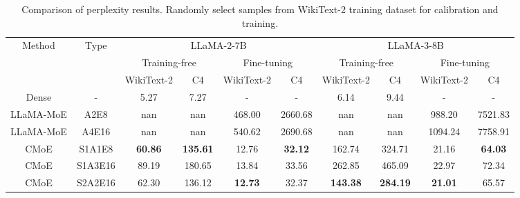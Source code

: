 \begin{table*}[t!]
    \centering
    \vspace{-2mm}
    \caption{Comparison of perplexity results. Randomly select samples from WikiText-2 training dataset for calibration and training.}
    \label{tab:1}
    \begin{adjustbox}{max width=0.85\textwidth}
    \begin{tabular}{cc|cc|cc|cc|cc}
        \toprule
        \multirow{3}{*}{Method} & \multirow{3}{*}{Type}   &\multicolumn{4}{c|}{LLaMA-2-7B} & \multicolumn{4}{c}{LLaMA-3-8B} \\

        ~ & ~  &\multicolumn{2}{c|}{Training-free} & \multicolumn{2}{c|}{Fine-tuning} &\multicolumn{2}{c|}{ Training-free} & \multicolumn{2}{c}{Fine-tuning} \\
        
         ~ & ~ & WikiText-2 & C4 & WikiText-2 & C4 & WikiText-2 & C4 & WikiText-2 & C4\\
         \midrule
         \midrule
         Dense & - & 5.27 & 7.27 & - & - & 6.14 & 9.44 & - & - \\
         LLaMA-MoE & A2E8 & nan & nan & 468.00 & 2660.68 & nan & nan & 988.20 & 7521.83 \\
         LLaMA-MoE & A4E16 & nan & nan & 540.62 & 2690.68 & nan & nan & 1094.24 & 7758.91 \\
         CMoE & S1A1E8 & \bf 60.86 & \bf 135.61 & 12.76 & \bf  32.12 & 162.74 & 324.71 & 21.16 & \bf  64.03 \\
         CMoE & S1A3E16 & 89.19 & 180.65 & 13.84 & 33.56 & 262.85 & 465.09 & 22.97 & 72.34 \\
         CMoE & S2A2E16 & 62.30 & 136.12 & \bf  12.73 & 32.37 & \bf 143.38 & \bf 284.19 & \bf  21.01 & 65.57 \\
        \bottomrule
    \end{tabular}
    \end{adjustbox}%
\end{table*}